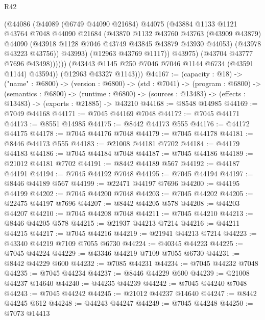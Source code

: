 \begin{lexlean}{R42}
\begin{coremodule}
{                    (@44086
                      (@44089
                        (@6749 @44090 @21684)
                        @44075
                        (@43884
                          @1133
                          @1121
                          @43764
                          @7048
                          @44090
                          @21684
                          (@43870
                            @1132
                            @43760
                            @43763
                            (@43909 @43879)
                            @44090
                            (@43918 @1128 @7046 @43749 @43845 @43879 @43930 @44053)
                            (@43978 @43223 @43756))
                          @43993)
                        (@12963 @43769 @1117))
                      @43975)
                    (@43704 @43777 @7696 @43498))))))
          (@43443 @1145 @250 @7046 @7046 @1144 @6734 (@43591 @1144) @43594))
        (@12963 @43327 @1143)))
@44167 := (capacity : @18) ->
  ("name" : @6800) ->
  (version : @6800) ->
  (std : @7041) ->
  (program : @6800) ->
  (semantics : @6800) ->
  (runtime : @6800) -> (sources : @13483) -> (effects : @13483) -> (exports : @21885) -> @43210
@44168 := @8548 @14985
@44169 := @7049 @44168
@44171 := @7045 @44169 @7048
@44172 := @7045 @44171
@44173 := @8551 @14985
@44175 := @8442 @44173 @555
@44176 := @44172 @44175
@44178 := @7045 @44176 @7048
@44179 := @7045 @44178
@44181 := @8446 @44173 @555
@44183 := @21008 @44181 @7702
@44184 := @44179 @44183
@44186 := @7045 @44184 @7048
@44187 := @7045 @44186
@44189 := @21012 @44181 @7702
@44191 := @8442 @44189 @567
@44192 := @44187 @44191
@44194 := @7045 @44192 @7048
@44195 := @7045 @44194
@44197 := @8446 @44189 @567
@44199 := @22471 @44197 @7696
@44200 := @44195 @44199
@44202 := @7045 @44200 @7048
@44203 := @7045 @44202
@44205 := @22475 @44197 @7696
@44207 := @8442 @44205 @578
@44208 := @44203 @44207
@44210 := @7045 @44208 @7048
@44211 := @7045 @44210
@44213 := @8446 @44205 @578
@44215 := @21937 @44213 @7214
@44216 := @44211 @44215
@44217 := @7045 @44216
@44219 := @21941 @44213 @7214
@44223 := @43340 @44219 @7109 @7055 @6730
@44224 := @40345 @44223
@44225 := @7045 @44224
@44229 := @43346 @44219 @7109 @7055 @6730
@44231 := @8442 @44229 @600
@44232 := @7085 @44231
@44234 := @7045 @44232 @7048
@44235 := @7045 @44234
@44237 := @8446 @44229 @600
@44239 := @21008 @44237 @14640
@44240 := @44235 @44239
@44242 := @7045 @44240 @7048
@44243 := @7045 @44242
@44245 := @21012 @44237 @14640
@44247 := @8442 @44245 @612
@44248 := @44243 @44247
@44249 := @7045 @44248
@44250 := @7073 @14413
}
\end{coremodule}
\end{lexlean}
